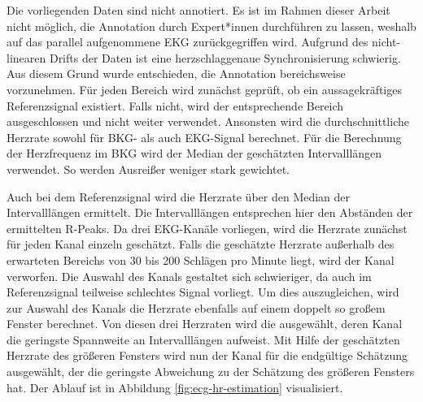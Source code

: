 	Die vorliegenden Daten sind nicht annotiert. Es ist im Rahmen dieser Arbeit nicht möglich, die Annotation durch Expert*innen durchführen zu lassen, weshalb auf das parallel aufgenommene \ac{EKG} zurückgegriffen wird. Aufgrund des nicht-linearen Drifts der Daten ist eine herzschlaggenaue Synchronisierung schwierig. Aus diesem Grund wurde entschieden, die Annotation bereichsweise vorzunehmen. Für jeden Bereich wird zunächst geprüft, ob ein aussagekräftiges Referenzsignal existiert. Falls nicht, wird der entsprechende Bereich ausgeschlossen und nicht weiter verwendet. Ansonsten wird die durchschnittliche Herzrate sowohl für BKG- als auch EKG-Signal berechnet. Für die Berechnung der Herzfrequenz im \ac{BKG} wird der Median der geschätzten Intervalllängen verwendet. So werden Ausreißer weniger stark gewichtet.
	
	Auch bei dem Referenzsignal wird die Herzrate über den Median der Intervalllängen ermittelt. Die Intervalllängen entsprechen hier den Abständen der ermittelten R-Peaks. Da drei \ac{EKG}-Kanäle vorliegen, wird die Herzrate zunächst für jeden Kanal einzeln geschätzt. Falls die geschätzte Herzrate außerhalb des erwarteten Bereichs von 30 bis 200 Schlägen pro Minute liegt, wird der Kanal verworfen. Die Auswahl des Kanals gestaltet sich schwieriger, da auch im Referenzsignal teilweise schlechtes Signal vorliegt. Um dies auszugleichen, wird zur Auswahl des Kanals die Herzrate ebenfalls auf einem doppelt so großem Fenster berechnet. Von diesen drei Herzraten wird die ausgewählt, deren Kanal die geringste Spannweite an Intervalllängen aufweist. Mit Hilfe der geschätzten Herzrate des größeren Fensters wird nun der Kanal für die endgültige Schätzung ausgewählt, der die geringste Abweichung zu der Schätzung des größeren Fensters hat. Der Ablauf ist in Abbildung \ref{fig:ecg-hr-estimation} visualisiert.
	
